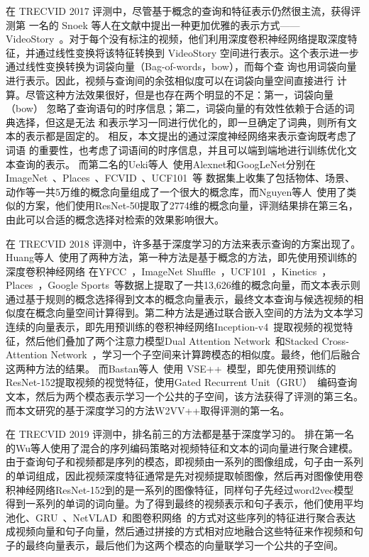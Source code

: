 在 TRECVID 2017 评测中，尽管基于概念的查询和特征表示仍然很主流，获得评测第
一名的 Snoek 等人在文献\cite{snoek2017university}中提出一种更加优雅的表示方式——VideoStory~\cite{habibian2014videostory}。对于每个没有标注的视频，他们利用深度卷积神经网络提取深度特征，并通过线性变换将该特征转换到
VideoStory 空间进行表示。这个表示进一步通过线性变换转换为词袋向量（Bag-of-words，bow），而每个查
询也用词袋向量进行表示。因此，视频与查询间的余弦相似度可以在词袋向量空间直接进行
计算。尽管这种方法效果很好，但是也存在两个明显的不足：第一，词袋向量（bow）
忽略了查询语句的时序信息；第二，词袋向量的有效性依赖于合适的词典选择，但这是无法
和表示学习一同进行优化的，即一旦确定了词典，则所有文本的表示都是固定的。
相反，本文提出的通过深度神经网络来表示查询既考虑了词语
的重要性，也考虑了词语间的时序信息，并且可以端到端地进行训练优化文本查询的表示。
而第二名的Ueki等人~\cite{ueki2017waseda}使用Alexnet和GoogLeNet分别在ImageNet~\cite{deng2009imagenet}、Places~\cite{zhou2014learning}、FCVID~\cite{jiang2017exploiting}、UCF101~\cite{soomro2012ucf101}等
数据集上收集了包括物体、场景、动作等一共5万维的概念向量组成了一个很大的概念库，而Nguyen等人~\cite{nguyen2017vireo}使用了类似的方案，他们使用ResNet-50提取了2774维的概念向量，评测结果排在第三名，由此可以合适的概念选择对检索的效果影响很大。

在 TRECVID 2018 评测中，许多基于深度学习的方法来表示查询的方案出现了。
Huang等人~\cite{huang2018informedia}使用了两种方法，第一种方法是基于概念的方法，即先使用预训练的深度卷积神经网络
在YFCC~\cite{thomee2016yfcc100m}，ImageNet Shuffle~\cite{mettes2016the}，UCF101~\cite{soomro2012ucf101}，Kinetics~\cite{carreira2017quo}，Places~\cite{zhou2014learning}，Google Sports~\cite{karpathy2014large}等数据上提取了一共13,626维的概念向量，而文本表示则通过基于规则的概念选择得到文本的概念向量表示，最终文本查询与候选视频的相似度在概念向量空间计算得到。第二种方法是通过联合嵌入空间的方法为文本学习连续的向量表示，即先用预训练的卷积神经网络Inception-v4~\cite{szegedy2016inception}提取视频的视觉特征，然后他们叠加了两个注意力模型Dual Attention Network~\cite{nam2017dual}和Stacked Cross-Attention Network~\cite{lee2018stacked}，学习一个子空间来计算跨模态的相似度。最终，他们后融合这两种方法的结果。
而Bastan等人~\cite{bastan2018ntu}使用 VSE++~\cite{faghri2017vse++}模型，即先使用预训练的ResNet-152提取视频的视觉特征，使用Gated Recurrent Unit（GRU）~\cite{cho2014learning}编码查询文本，然后为两个模态表示学习一个公共的子空间，该方法获得了评测的第三名。而本文研究的基于深度学习的方法W2VV++取得评测的第一名。

在 TRECVID 2019 评测中，排名前三的方法都是基于深度学习的。
排在第一名的Wu等人\cite{wu2019hybrid}使用了混合的序列编码策略对视频特征和文本的词向量进行聚合建模。由于查询句子和视频都是序列的模态，即视频由一系列的图像组成，句子由一系列的单词组成，因此视频深度特征通常是先对视频提取帧图像，然后再对图像使用卷积神经网络ResNet-152到的是一系列的图像特征，同样句子先经过word2vec模型得到一系列的单词的词向量。为了得到最终的视频表示和句子表示，他们使用平均池化、GRU~\cite{cho2014learning}、NetVLAD~\cite{arandjelovic2016netvlad}和图卷积网络~\cite{mao2018hierarchical}的方式对这些序列的特征进行聚合表达成视频向量和句子向量，然后通过拼接的方式相对应地融合这些特征来作视频和句子的最终向量表示，最后他们为这两个模态的向量联学习一个公共的子空间。

